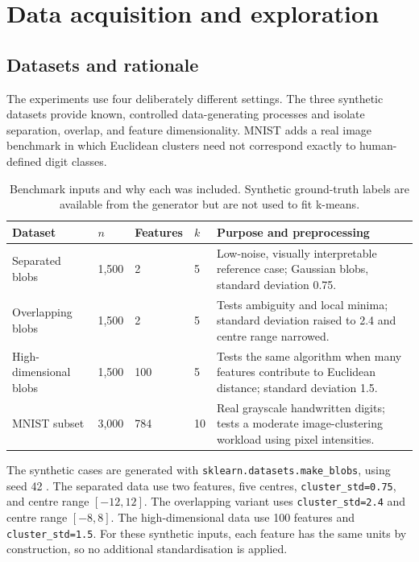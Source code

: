 \documentclass[10pt,a4paper]{article}
\begin{document}
\section{Data acquisition and exploration}
\subsection{Datasets and rationale}
The experiments use four deliberately different settings. The three synthetic datasets provide known, controlled data-generating processes and isolate separation, overlap, and feature dimensionality. MNIST adds a real image benchmark in which Euclidean clusters need not correspond exactly to human-defined digit classes.
\begin{table}[H]
\centering\small
\caption{Benchmark inputs and why each was included. Synthetic ground-truth labels are available from the generator but are not used to fit k-means.}
\begin{tabular}{p{2.25cm}p{2cm}p{2.1cm}p{2.3cm}p{4.0cm}}
\toprule
Dataset & $n$ & Features & $k$ & Purpose and preprocessing\\
\midrule
Separated blobs & 1,500 & 2 & 5 & Low-noise, visually interpretable reference case; Gaussian blobs, standard deviation 0.75.\\
Overlapping blobs & 1,500 & 2 & 5 & Tests ambiguity and local minima; standard deviation raised to 2.4 and centre range narrowed.\\
High-dimensional blobs & 1,500 & 100 & 5 & Tests the same algorithm when many features contribute to Euclidean distance; standard deviation 1.5.\\
MNIST subset & 3,000 & 784 & 10 & Real grayscale handwritten digits; tests a moderate image-clustering workload using pixel intensities.\\
\bottomrule
\end{tabular}
\end{table}

The synthetic cases are generated with \texttt{sklearn.datasets.make\_blobs}, using seed 42 \cite{scikitlearn}. The separated data use two features, five centres, \texttt{cluster\_std=0.75}, and centre range $[-12,12]$. The overlapping variant uses \texttt{cluster\_std=2.4} and centre range $[-8,8]$. The high-dimensional data use 100 features and \texttt{cluster\_std=1.5}. For these synthetic inputs, each feature has the same units by construction, so no additional standardisation is applied.
\end{document}
